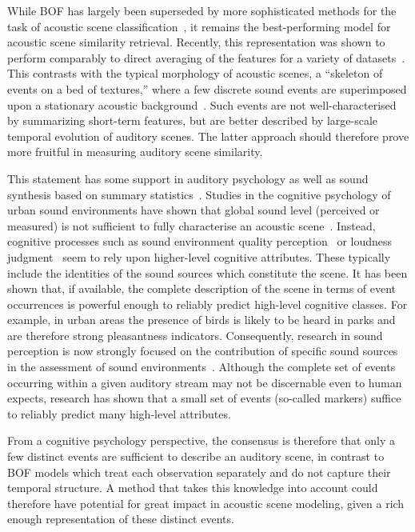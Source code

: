 \documentclass[smallextended]{svjour3}
\begin{document}
While BOF has largely been superseded by more sophisticated methods for the task of acoustic scene classification~\cite{7100934}, it remains the best-performing model for acoustic scene similarity retrieval.
Recently, this representation was shown to perform comparably to direct averaging of the features for a variety of datasets~\cite{lagrange:hal-01082501}.
This contrasts with the typical morphology of acoustic scenes, a ``skeleton of events on a bed of textures,'' where a few discrete sound events are superimposed upon a stationary acoustic background~\cite{nelken2013}.
Such events are not well-characterised by summarizing short-term features, but are better described by large-scale temporal evolution of auditory scenes.
The latter approach should therefore prove more fruitful in measuring auditory scene similarity.

This statement has some support in auditory psychology as well as sound synthesis based on summary statistics~\cite{mcdermott2013summary}. Studies in the cognitive psychology of urban sound environments have shown that global sound level (perceived or measured) is not sufficient to fully characterise an acoustic scene~\cite{guyot2005urban,kang2006urban}. Instead, cognitive processes such as sound environment quality perception~\cite{dubois2006cognitive} or loudness judgment~\cite{kuwano_memory_2003} seem to rely upon higher-level cognitive attributes. These typically include the identities of the sound sources which constitute the scene. It has been shown that, if available, the complete description of the scene in terms of event occurrences is powerful enough to reliably predict high-level cognitive classes. For example, in urban areas the presence of birds is likely to be heard in parks and are therefore strong pleasantness indicators. Consequently, research in sound perception is now strongly focused on the contribution of specific sound sources in the assessment of sound environments~\cite{ricciardi2015sound,lavandier2006contribution}. Although the complete set of events occurring within a given auditory stream may not be discernable even to human expects, research has shown that a small set of events (so-called markers) suffice to reliably predict many high-level attributes.

From a cognitive psychology perspective, the consensus is therefore that only a few distinct events are sufficient to describe an auditory scene, in contrast to BOF models which treat each observation separately and do not capture their temporal structure. A method that takes this knowledge into account could therefore have potential for great impact in acoustic scene modeling, given a rich enough representation of these distinct events.
\end{document}

